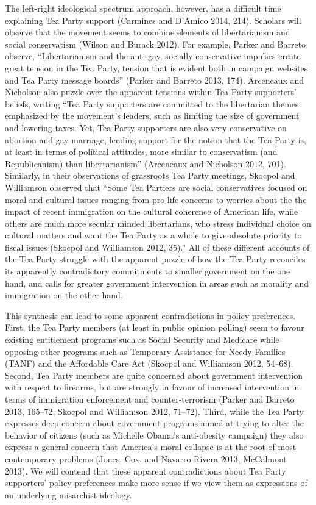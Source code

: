 \documentclass[12pt,]{article}
\begin{document}
The left-right ideological spectrum approach, however, has a difficult
time explaining Tea Party support (Carmines and D'Amico 2014, 214).
Scholars will observe that the movement seems to combine elements of
libertarianism and social conservatism (Wilson and Burack 2012). For
example, Parker and Barreto observe, ``Libertarianism and the anti-gay,
socially conservative impulses create great tension in the Tea Party,
tension that is evident both in campaign websites and Tea Party message
boards'' (Parker and Barreto 2013, 174). Arceneaux and Nicholson also
puzzle over the apparent tensions within Tea Party supporters' beliefs,
writing ``Tea Party supporters are committed to the libertarian themes
emphasized by the movement's leaders, such as limiting the size of
government and lowering taxes. Yet, Tea Party supporters are also very
conservative on abortion and gay marriage, lending support for the
notion that the Tea Party is, at least in terms of political attitudes,
more similar to conservatism (and Republicanism) than libertarianism''
(Arceneaux and Nicholson 2012, 701). Similarly, in their observations of
grassroots Tea Party meetings, Skocpol and Williamson observed that
``Some Tea Partiers are social conservatives focused on moral and
cultural issues ranging from pro-life concerns to worries about the the
impact of recent immigration on the cultural coherence of American life,
while others are much more secular minded libertarians, who stress
individual choice on cultural matters and want the Tea Party as a whole
to give absolute priority to fiscal issues (Skocpol and Williamson 2012,
35).'' All of these different accounts of the Tea Party struggle with
the apparent puzzle of how the Tea Party reconciles its apparently
contradictory commitments to smaller government on the one hand, and
calls for greater government intervention in areas such as morality and
immigration on the other hand.

This synthesis can lead to some apparent contradictions in policy
preferences. First, the Tea Party members (at least in public opinion
polling) seem to favour existing entitlement programs such as Social
Security and Medicare while opposing other programs such as Temporary
Assistance for Needy Families (TANF) and the Affordable Care Act
(Skocpol and Williamson 2012, 54--68). Second, Tea Party members are
quite concerned about government intervention with respect to firearms,
but are strongly in favour of increased intervention in terms of
immigration enforcement and counter-terrorism (Parker and Barreto 2013,
165--72; Skocpol and Williamson 2012, 71--72). Third, while the Tea
Party expresses deep concern about government programs aimed at trying
to alter the behavior of citizens (such as Michelle Obama's anti-obesity
campaign) they also express a general concern that America's moral
collapse is at the root of most contemporary problems (Jones, Cox, and
Navarro-Rivera 2013; McCalmont 2013). We will contend that these
apparent contradictions about Tea Party supporters' policy preferences
make more sense if we view them as expressions of an underlying
misarchist ideology.
\end{document}
